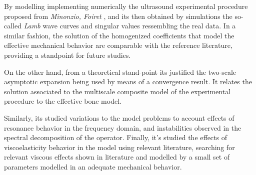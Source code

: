 \begin{intro}
By modelling implementing numerically the ultrasound experimental procedure proposed from \textit{Minonzio, Foiret} \cite{Foiret2014}, and \cite{Foiret2014} its then obtained by simulations the so-called \textit{Lamb} wave curves and singular values ressembling the real data. In a similar fashion, the solution of the homogenized coefficients that model the effective mechanical behavior are comparable with the reference literature, providing a standpoint for future studies.

On the other hand, from a theoretical stand-point its justified the two-scale asymptotic expansion being used by means of a convergence result. It relates the solution associated to the multiscale composite model of the experimental procedure to the effective bone model.

Similarly, its studied variations to the model problems to account effects of resonance behavior in the frequency domain, and instabilities observed in the spectral decomposition of the operator. 
Finally, it's studied the effects of viscoelasticity behavior in the model using relevant literature, searching for relevant viscous effects shown in literature and modelled by a small set of parameters modelled in an adequate mechanical behavior.


\end{intro}